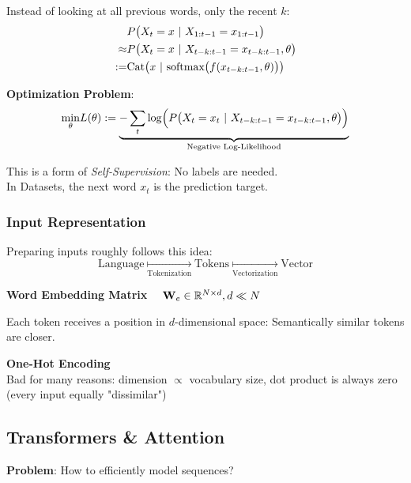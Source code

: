 Instead of looking at all previous words, only the recent $k$:\\
\begin{align*}
            &P\bigl( X_t=x\ |\  X_{1:t-1} = x_{1:t-1} \bigr)                                     \\
    \approx &P\bigl(X_t=x\ |\  X_{t-k:t-1} = x_{t-k:t-1}, \theta\bigr)                           \\
    :=      & \text{Cat}\bigl( x \ |\  \text{softmax}\bigl( f(x_{t-k:t-1}, \theta) \bigr) \bigr)
\end{align*}

\textbf{Optimization Problem}:
$$
    \underset{\theta}{\min} L(\theta) := \underbrace{-\sum_{t}\log\Bigl( P\bigl( X_t=x_t\ |\  X_{t-k:t-1} = x_{t-k:t-1}, \theta \bigr) \Bigr)}_\text{Negative Log-Likelihood}  
$$

This is a form of \textit{Self-Supervision}: No labels are needed.\\
In Datasets, the next word $x_t$ is the prediction target.\\

\subsubsection{Input Representation}

Preparing inputs roughly follows this idea:
$$
    \text{Language} \underset{\text{Tokenization}}{\mapsto} \text{Tokens} \underset{\text{Vectorization}}{\mapsto} \text{Vector}
$$

 \textbf{Word Embedding Matrix} $\quad \mathbf{W}_e \in \mathbb{R}^{N\times d}, d \ll N$\\ 

Each token receives a position in $d$-dimensional space: Semantically similar tokens are closer.

{\footnotesize
    \remark \textbf{One-Hot Encoding}\\
    Bad for many reasons: dimension $\propto$ vocabulary size, dot product is always zero (every input equally "dissimilar")
}

\newpage
\subsection{Transformers \& Attention}

\textbf{Problem}: How to efficiently model sequences?

